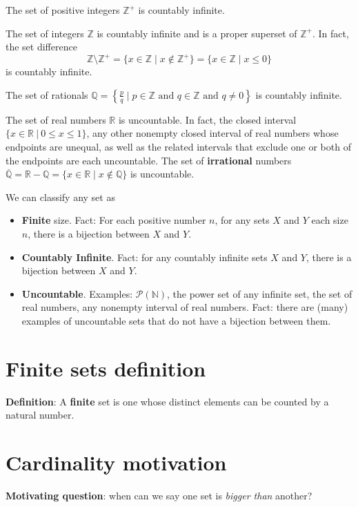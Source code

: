 \documentclass[12pt, oneside]{article}
\begin{document}
The set of positive integers $\mathbb{Z}^{+}$ is countably infinite.

The set of integers $\mathbb{Z}$ is countably infinite and is a proper superset of $\mathbb{Z}^{+}$. 
In fact, the set difference 
$$\mathbb{Z} \setminus \mathbb{Z}^{+} = \{ x \in \mathbb{Z} \mid x \notin \mathbb{Z}^+\} 
= \{ x \in \mathbb{Z} \mid x \leq 0 \}$$ is countably infinite.

The set of rationals 
$\mathbb{Q} = \left\{ \frac{p}{q} \mid p \in \mathbb{Z}  \text{ and  } 
q  \in \mathbb{Z} \text{ and } q \neq  0 \right\}$ is countably infinite.


The set of real numbers $\mathbb{R}$ is uncountable. In fact, the closed 
interval $\{x \in \mathbb{R} ~|~ 0 \leq x \leq 1\}$, 
any other nonempty closed interval of real numbers whose endpoints are 
unequal, as well as the related intervals that exclude one or both of the endpoints are
each uncountable.
The set of {\bf irrational} numbers $\overline{\mathbb{Q}} = \mathbb{R} - \mathbb{Q}
= \{ x \in \mathbb{R} \mid x \notin \mathbb{Q} \}$ is uncountable.

\vfill

We can classify any set as 
\begin{itemize}
\item {\bf Finite} size. Fact: For each positive number $n$, for any sets $X$ and $Y$ each 
size $n$, there is a bijection between $X$ and $Y$.
\item {\bf Countably Infinite}. Fact: for any countably infinite sets $X$ and $Y$, there is a bijection
between $X$ and $Y$.
\item {\bf Uncountable}. Examples: $\mathcal{P}(\mathbb{N})$, the power set of any infinite set, 
the set of real numbers, any nonempty interval of real numbers. Fact: there are (many) examples 
of uncountable sets that do not have a bijection between them.
\end{itemize} \vfill
\section*{Finite sets definition}


{\bf Definition}: A {\bf finite} set is one whose distinct elements can be counted by a natural number.
 \vfill
\section*{Cardinality motivation}


{\bf Motivating question}: when can we say one set is {\it bigger than} another?
\end{document}
